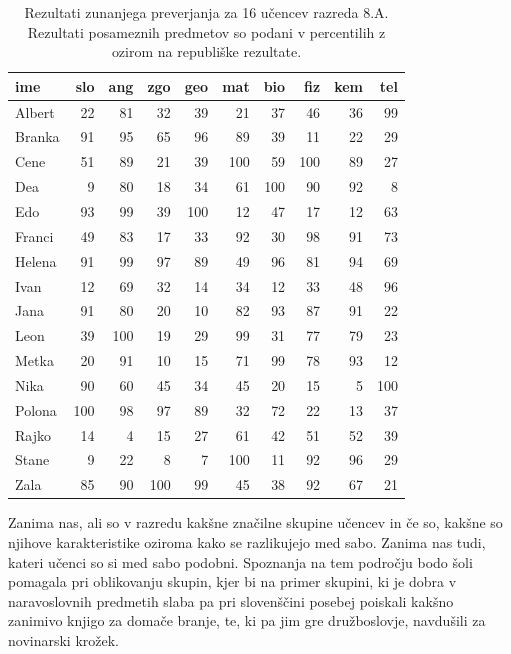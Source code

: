\begin{table}[htbp]
\caption{Rezultati zunanjega preverjanja za 16 učencev razreda 8.A. Rezultati
  posameznih predmetov so podani v percentilih z ozirom na republiške
  rezultate.}
\label{t-eksterci}
\begin{center}
\begin{tabular}{lrrrrrrrrr}
\toprule
ime & slo & ang & zgo & geo & mat & bio & fiz & kem & tel \\
\midrule
Albert & 22 & 81 & 32 & 39 & 21 & 37 & 46 & 36 & 99 \\
Branka & 91 & 95 & 65 & 96 & 89 & 39 & 11 & 22 & 29 \\
Cene & 51 & 89 & 21 & 39 & 100 & 59 & 100 & 89 & 27 \\
Dea & 9 & 80 & 18 & 34 & 61 & 100 & 90 & 92 & 8 \\
Edo & 93 & 99 & 39 & 100 & 12 & 47 & 17 & 12 & 63 \\
Franci & 49 & 83 & 17 & 33 & 92 & 30 & 98 & 91 & 73 \\
Helena & 91 & 99 & 97 & 89 & 49 & 96 & 81 & 94 & 69 \\
Ivan & 12 & 69 & 32 & 14 & 34 & 12 & 33 & 48 & 96 \\
Jana & 91 & 80 & 20 & 10 & 82 & 93 & 87 & 91 & 22 \\
Leon & 39 & 100 & 19 & 29 & 99 & 31 & 77 & 79 & 23 \\
Metka & 20 & 91 & 10 & 15 & 71 & 99 & 78 & 93 & 12 \\
Nika & 90 & 60 & 45 & 34 & 45 & 20 & 15 & 5 & 100 \\
Polona & 100 & 98 & 97 & 89 & 32 & 72 & 22 & 13 & 37 \\
Rajko & 14 & 4 & 15 & 27 & 61 & 42 & 51 & 52 & 39 \\
Stane & 9 & 22 & 8 & 7 & 100 & 11 & 92 & 96 & 29 \\
Zala & 85 & 90 & 100 & 99 & 45 & 38 & 92 & 67 & 21 \\
\bottomrule
\end{tabular}
\end{center}
\end{table}

Zanima nas, ali so v razredu kakšne značilne skupine učencev in če so,
kakšne so njihove karakteristike oziroma kako se razlikujejo med
sabo. Zanima nas tudi, kateri učenci so si med sabo podobni. Spoznanja
na tem področju bodo šoli pomagala pri oblikovanju skupin, kjer bi na
primer skupini, ki je dobra v naravoslovnih predmetih slaba pa pri
slovenščini posebej poiskali kakšno zanimivo knjigo za domače branje,
te, ki pa jim gre družboslovje, navdušili za novinarski krožek.

